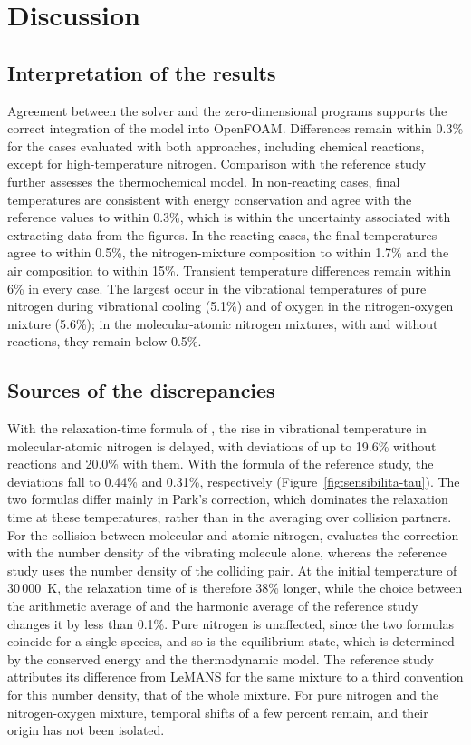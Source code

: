 \section{Discussion}
\label{sec:discussione}

\subsection{Interpretation of the results}
\label{sec:discussione-risultati}

Agreement between the solver and the zero-dimensional programs supports the
correct integration of the model into OpenFOAM. Differences remain within
0.3\% for the cases evaluated with both approaches, including chemical
reactions, except for high-temperature nitrogen. Comparison with the reference
study further assesses the thermochemical model. In non-reacting cases, final
temperatures are consistent with energy conservation and agree with the reference values to
within 0.3\%, which is within the uncertainty associated with extracting data
from the figures. In the reacting cases, the final temperatures agree to
within 0.5\%, the nitrogen-mixture composition to within 1.7\% and the air
composition to within 15\%. Transient temperature differences remain within
6\% in every case. The largest occur in the vibrational temperatures of pure
nitrogen during vibrational cooling (5.1\%) and of oxygen in the
nitrogen-oxygen mixture (5.6\%); in the molecular-atomic nitrogen mixtures,
with and without reactions, they remain below 0.5\%.

\subsection{Sources of the discrepancies}
\label{sec:discussione-origine}

With the relaxation-time formula of \mpp{}, the rise in vibrational
temperature in molecular-atomic nitrogen is delayed, with deviations of up to
19.6\% without reactions and 20.0\% with them. With the formula of the
reference study, the deviations fall to 0.44\% and 0.31\%, respectively
(Figure~\ref{fig:sensibilita-tau}). The two formulas differ mainly in Park's
correction, which dominates the relaxation time at these temperatures, rather
than in the averaging over collision partners. For the collision between
molecular and atomic nitrogen, \mpp{} evaluates the correction with the number
density of the vibrating molecule alone, whereas the reference study uses the
number density of the colliding pair. At the initial temperature of
30\,000~K, the relaxation time of \mpp{} is therefore 38\% longer, while the
choice between the arithmetic average of \mpp{} and the harmonic average of
the reference study changes it by less than 0.1\%. Pure nitrogen is
unaffected, since the two formulas coincide for a single species, and so is
the equilibrium state, which is determined by the conserved energy and the
thermodynamic model. The reference study attributes its difference from
LeMANS for the same mixture to a third convention for this number density,
that of the whole mixture. For pure nitrogen and the nitrogen-oxygen mixture,
temporal shifts of a few percent remain, and their origin has not been
isolated.


